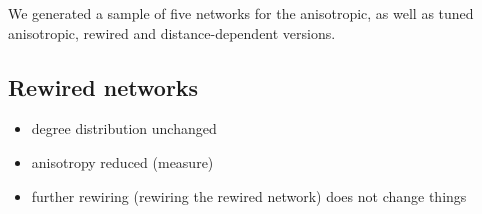 
We generated a sample of five networks for the anisotropic, as well as
tuned anisotropic, rewired and distance-dependent versions.


\subsection{Rewired networks}

\begin{itemize}
\item  degree distribution unchanged
\item  anisotropy reduced (measure)
\item  further rewiring (rewiring the rewired network) does not change things  
\end{itemize}

